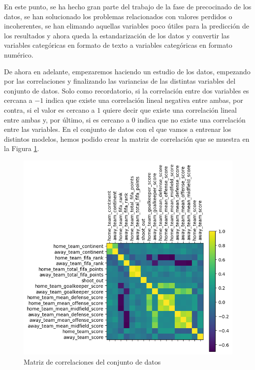 En este punto, se ha hecho gran parte del trabajo de la fase de precocinado de los datos, se han solucionado los problemas relacionados con valores perdidos o incoherentes, se han elimando aquellas variables poco útiles para la predicción de los resultados y ahora queda la estandarización de los datos y convertir las variables categóricas en formato de texto a variables categóricas en formato numérico.
\newline

De ahora en adelante, empezaremos haciendo un estudio de los datos, empezando por las correlaciones y finalizando las variancias de las distintas variables del conjunto de datos. Solo como recordatorio, si la correlación entre dos variables es cercana a $-1$ indica que existe una correlación lineal negativa entre ambas, por contra, si el valor es cercano a $1$ quiere decir que existe una correlación lineal entre ambas y, por último, si es cercano a $0$ indica que no existe una correlación entre las variables. En el conjunto de datos con el que vamos a entrenar los distintos modelos, hemos podido crear la matriz de correlación que se muestra en la Figura \ref{Conjunto-Datos-Matriz-Correlaciones}.

\begin{figure}[H]
    \centering
    \includegraphics[width=\figsize]{images/correlationMatrix.png}
    \caption{Matriz de correlaciones del conjunto de datos}
    \label{Conjunto-Datos-Matriz-Correlaciones}
\end{figure}

